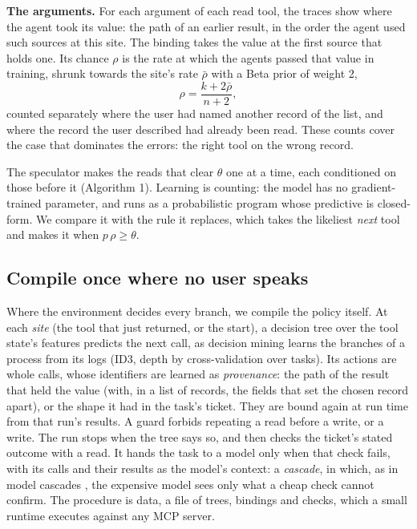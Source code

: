 \documentclass[10pt,twocolumn,letterpaper]{article}
\newcommand{\runin}[1]{{\sffamily\bfseries\color{accent}#1}}
\begin{document}
\runin{The arguments.} For each argument of each read tool, the traces show where the agent took its value: the path of an earlier result, in the order the agent used such sources at this site. The binding takes the value at the first source that holds one. Its chance \(\rho\) is the rate at which the agents passed that value in training, shrunk towards the site's rate \(\bar\rho\) with a Beta prior of weight 2, \[\rho = \frac{k + 2\bar\rho}{n + 2},\] counted separately where the user had named another record of the list, and where the record the user described had already been read. These counts cover the case that dominates the errors: the right tool on the wrong record.

The speculator makes the reads that clear \(\theta\) one at a time, each conditioned on those before it (Algorithm 1). Learning is counting: the model has no gradient-trained parameter, and runs as a probabilistic program \citep{nodeland2026fugue} whose predictive is closed-form. We compare it with the rule it replaces, which takes the likeliest \emph{next} tool and makes it when \(p\,\rho \ge \theta\).



\hypertarget{compile-once-where-no-user-speaks}{%
\subsection{Compile once where no user speaks}\label{compile-once-where-no-user-speaks}}

Where the environment decides every branch, we compile the policy itself. At each \emph{site} (the tool that just returned, or the start), a decision tree over the tool state's features predicts the next call, as decision mining learns the branches of a process from its logs \citep{rozinat2006decision} (ID3, depth by cross-validation over tasks). Its actions are whole calls, whose identifiers are learned as \emph{provenance}: the path of the result that held the value (with, in a list of records, the fields that set the chosen record apart), or the shape it had in the task's ticket. They are bound again at run time from that run's results. A guard forbids repeating a read before a write, or a write. The run stops when the tree says so, and then checks the ticket's stated outcome with a read. It hands the task to a model only when that check fails, with its calls and their results as the model's context: a \emph{cascade}, in which, as in model cascades \citep{chen2023frugalgpt, madaan2024automix}, the expensive model sees only what a cheap check cannot confirm. The procedure is data, a file of trees, bindings and checks, which a small runtime executes against any MCP server.
\end{document}
